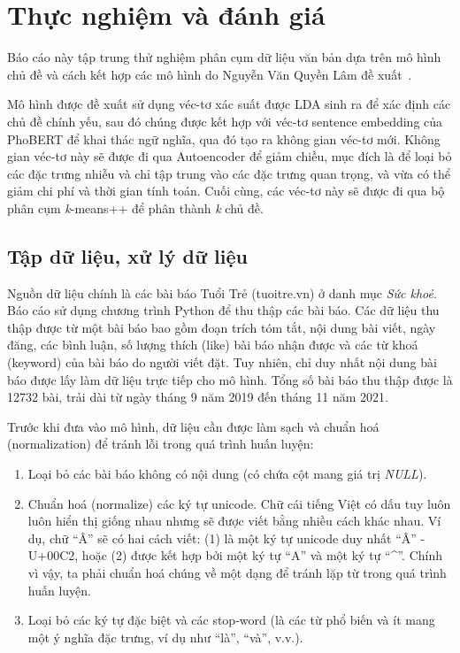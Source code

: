 \chapter{Thực nghiệm và đánh giá}
\label{sec:experiments}

Báo cáo này tập trung thử nghiệm phân cụm dữ liệu văn bản dựa trên mô hình chủ
đề và cách kết hợp các mô hình do Nguyễn Văn Quyền Lâm đề
xuất~\cite{lamGomCumVan2021}.

Mô hình được đề xuất sử dụng véc-tơ xác suất được LDA sinh ra để xác định các
chủ đề chính yếu, sau đó chúng được kết hợp với véc-tơ sentence embedding của
PhoBERT để khai thác ngữ nghĩa, qua đó tạo ra không gian véc-tơ mới. Không gian
véc-tơ này sẽ được đi qua Autoencoder để giảm chiều, mục đích là để loại bỏ các
đặc trưng nhiễu và chỉ tập trung vào các đặc trưng quan trọng, và vừa có thể
giảm chi phí và thời gian tính toán. Cuối cùng, các véc-tơ này sẽ được đi qua
bộ phân cụm \textit{k}-means++ để phân thành \textit{k} chủ đề.


\section{Tập dữ liệu, xử lý dữ liệu}

Nguồn dữ liệu chính là các bài báo Tuổi Trẻ (tuoitre.vn) ở danh mục \textit{Sức
khoẻ}. Báo cáo sử dụng chương trình Python để thu thập các bài báo. Các dữ liệu
thu thập được từ một bài báo bao gồm đoạn trích tóm tắt, nội dung bài viết,
ngày đăng, các bình luận, số lượng thích (like) bài báo nhận được và các từ
khoá (keyword) của bài báo do người viết đặt. Tuy nhiên, chỉ duy nhất nội dung
bài báo được lấy làm dữ liệu trực tiếp cho mô hình. Tổng số bài báo thu thập
được là 12732 bài, trải dài từ ngày tháng 9 năm 2019 đến tháng 11 năm 2021.

Trước khi đưa vào mô hình, dữ liệu cần được làm sạch và chuẩn hoá
(normalization) để tránh lỗi trong quá trình huấn luyện:
\begin{enumerate}
    \item Loại bỏ các bài báo không có nội dung (có chứa cột mang giá trị
        \textit{NULL}).
    \item Chuẩn hoá (normalize) các ký tự unicode. Chữ cái tiếng Việt có dấu
        tuy luôn luôn hiển thị giống nhau nhưng sẽ được viết bằng nhiều cách
        khác nhau. Ví dụ, chữ ``Â'' sẽ có hai cách viết: (1) là một ký tự unicode
        duy nhất ``Â'' - U+00C2, hoặc (2) được kết hợp bởi một ký tự ``A'' và một
        ký tự ``\^{}''. Chính vì vậy, ta phải chuẩn hoá chúng về một dạng để tránh
        lặp từ trong quá trình huấn luyện.
    \item Loại bỏ các ký tự đặc biệt và các stop-word (là các từ phổ biến và ít
        mang một ý nghĩa đặc trưng, ví dụ như ``là'', ``và'', v.v.).
\end{enumerate}


